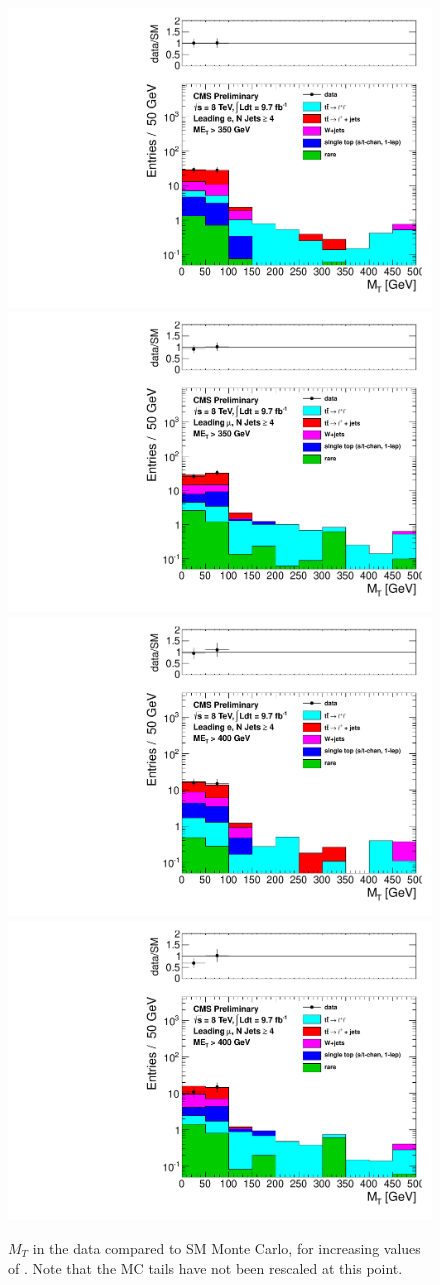 \begin{figure}[hbt]
  \begin{center}
        \includegraphics[width=0.5\linewidth]{plots/mt_met350_ele.pdf}%
        \includegraphics[width=0.5\linewidth]{plots/mt_met350_muo.pdf}
        \includegraphics[width=0.5\linewidth]{plots/mt_met400_ele.pdf}%
        \includegraphics[width=0.5\linewidth]{plots/mt_met400_muo.pdf}

    \caption{$M_T$ in the data compared to SM Monte Carlo, for
      increasing values of \met. Note that the MC tails have not
      been rescaled at this point.
\label{fig:mtsig3}
}  
      \end{center}
\end{figure}

\clearpage
